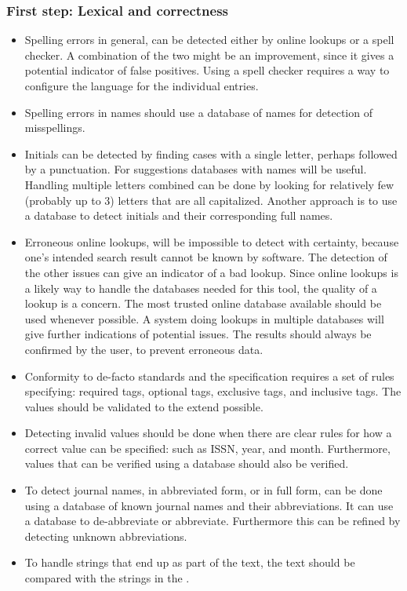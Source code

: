 \subsubsection{First step: Lexical and correctness}
\begin{itemize}
\item Spelling errors in general, can be detected either by online
  lookups or a spell checker.  A combination of the two might be an
  improvement, since it gives a potential indicator of false
  positives.  Using a spell checker requires a way to configure the
  language for the individual entries.

\item Spelling errors in names should use a database of names for
  detection of misspellings.

\item Initials can be detected by finding cases with a single letter,
  perhaps followed by a punctuation.  For suggestions databases with
  names will be useful.  Handling multiple letters combined can be
  done by looking for relatively few (probably up to 3) letters that
  are all capitalized.  Another approach is to use a database to
  detect initials and their corresponding full names.

\item Erroneous online lookups, will be impossible to detect with
  certainty, because one's intended search result cannot be known by
  software.  The detection of the other issues can give an indicator
  of a bad lookup.  Since online lookups is a likely way to handle the
  databases needed for this tool, the quality of a lookup is a
  concern.  The most trusted online database available should be used
  whenever possible.  A system doing lookups in multiple databases
  will give further indications of potential issues.  The results
  should always be confirmed by the user, to prevent erroneous data.

\item Conformity to de-facto standards and the {\bibtex} specification
  requires a set of rules specifying: required tags, optional tags,
  exclusive tags, and inclusive tags.  The values should be validated
  to the extend possible.

\item Detecting invalid values should be done when there are clear
  rules for how a correct value can be specified: such as ISSN, year,
  and month.  Furthermore, values that can be verified using a
  database should also be verified.

\item To detect journal names, in abbreviated form, or in full form,
  can be done using a database of known journal names and their
  abbreviations.  It can use a database to de-abbreviate or
  abbreviate.  Furthermore this can be refined by detecting unknown
  abbreviations.

\item To handle {\bibtex} strings that end up as part of the text, the
  text should be compared with the strings in the .
\end{itemize}


